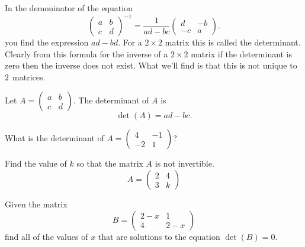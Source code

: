 In the demoninator of the equation
\[ \begin{pmatrix} a & b \\ c & d \end{pmatrix}^{-1} = \frac{1}{ad-bc} \begin{pmatrix} d &
    -b \\ -c & a \end{pmatrix}. \]
you find the expression $ad-bd$.  For a $2 \times 2$ matrix this is called the
determinant.  Clearly from this formula for the inverse of a $2\times 2$ matrix if the
determinant is zero then the inverse does not exist.  What we'll find is that this is not
unique to $2\time 2$ matrices.

\begin{definition}
    Let $A = \begin{pmatrix} a & b \\ c & d \end{pmatrix}$.  The determinant of $A$ is 
    \[ \det(A) = ad - bc. \]
\end{definition}

\begin{problem}
    What is the determinant of $A = \begin{pmatrix} 4 & -1 \\ -2 & 1 \end{pmatrix}$?
\end{problem}
%
\begin{problem}
    Find the value of $k$ so that the matrix $A$ is not invertible.
    \[ A = \begin{pmatrix} 2 & 4 \\ 3 & k \end{pmatrix} \]
\end{problem}

\begin{problem}
    Given the matrix 
    \[ B = \begin{pmatrix} 2-x & 1 \\ 4 & 2-x \end{pmatrix} \]
    find all of the values of $x$ that are solutions to the equation $\det(B) = 0$.
\end{problem}


